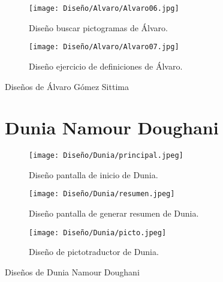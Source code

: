 \begin{figure}[h!]
  \ContinuedFloat

  \begin{subfigure}{\textwidth}
    \centering
    \texttt{[image: Diseño/Alvaro/Alvaro06.jpg]}
    \caption{Diseño buscar pictogramas de Álvaro.}
    \label{fig:disenyoAlvaro06}
  \end{subfigure}

  \begin{subfigure}{\textwidth}
    \centering
    \texttt{[image: Diseño/Alvaro/Alvaro07.jpg]}
    \caption{Diseño ejercicio de definiciones de Álvaro.}
    \label{fig:disenyoAlvaro07}
  \end{subfigure}

  \caption{Diseños de Álvaro Gómez Sittima}
  \label{fig:disenyoAlvaro}
\end{figure}


\begin{figure}[h!]
  \section{Dunia Namour Doughani}
  \begin{subfigure}{\textwidth}
    \centering
    \texttt{[image: Diseño/Dunia/principal.jpeg]}
    \caption{Diseño pantalla de inicio de Dunia.}
    \label{dunia1}
  \end{subfigure}

  \begin{subfigure}{\textwidth}
    \centering
    \texttt{[image: Diseño/Dunia/resumen.jpeg]}
    \caption{Diseño pantalla de generar resumen de Dunia.}
    \label{dunia2}
  \end{subfigure}

  \begin{subfigure}{\textwidth}
    \centering
    \texttt{[image: Diseño/Dunia/picto.jpeg]}
    \caption{Diseño de pictotraductor de Dunia.}
    \label{dunia3}
  \end{subfigure}

  \caption{Diseños de Dunia Namour Doughani}
  \label{fig:disenyoDunia}
\end{figure}

